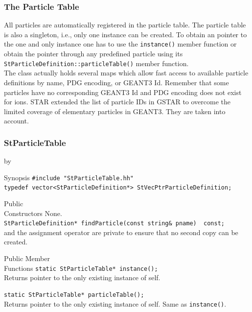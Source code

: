 \documentclass[twoside]{article}
\newcommand{\comp}[1]{\texttt{#1}}%
\newcommand{\entrylabel}[1]{\mbox{\textbf{{#1}}}\hfil}%
\newenvironment{entry}
{\begin{list}{}%
    {\renewcommand{\makelabel}{\entrylabel}%
     \setlength{\labelwidth}{90pt}%
     \setlength{\leftmargin}{\labelwidth}
     \advance\leftmargin by \labelsep%
      }%
    }%
  {\end{list}}
\newcommand{\Entrylabel}[1]%
{\raisebox{0pt}[1ex][0pt]{\makebox[\labelwidth][l]%
    {\parbox[t]{\labelwidth}{\hspace{0pt}\textbf{{#1}}}}}}
\newenvironment{Entry}%
{\renewcommand{\entrylabel}{\Entrylabel}\begin{entry}}%
  {\end{entry}}
\begin{document}
\begin{description}
\subsubsection{The Particle Table}
\label{sec:partTable}

All particles are automatically registered in the particle table. The
particle table is also a singleton, i.e., only one instance can be
created. To obtain an pointer to the one and only instance one has to
use the \comp{instance()} member function or obtain the pointer
through any predefined particle using its
\comp{StParticleDefinition::particleTable()} member function.\\
The class actually holds several maps which allow fast access to
available particle definitions by name, PDG encoding, or GEANT3 Id.
Remember that some particles have no corresponding GEANT3 Id and
PDG encoding does not exist for ions.  STAR extended the list of
particle IDs in GSTAR to overcome the limited coverage of elementary
particles in GEANT3. They are taken into account.

\subsubsection{StParticleTable}
\begin{Entry}
\item[Synopsis]
    \verb+#include "StParticleTable.hh"+\\    
    \verb+typedef vector<StParticleDefinition*> StVecPtrParticleDefinition;+\\  
    
\item[Public\\ Constructors]
    None.\\
    \verb+StParticleDefinition* findParticle(const string& pname)  const;+\\
    and the assignment operator are private to ensure that
    no second copy can be created.
    
\item[Public Member\\ Functions]
    \verb+static StParticleTable* instance();+\\ 
    Returns pointer to the only existing instance of self.

    \verb+static StParticleTable* particleTable();+\\
    Returns pointer to the only existing instance of self.
    Same as \comp{instance()}.
    

\end{Entry}
\end{description}
\end{document}

